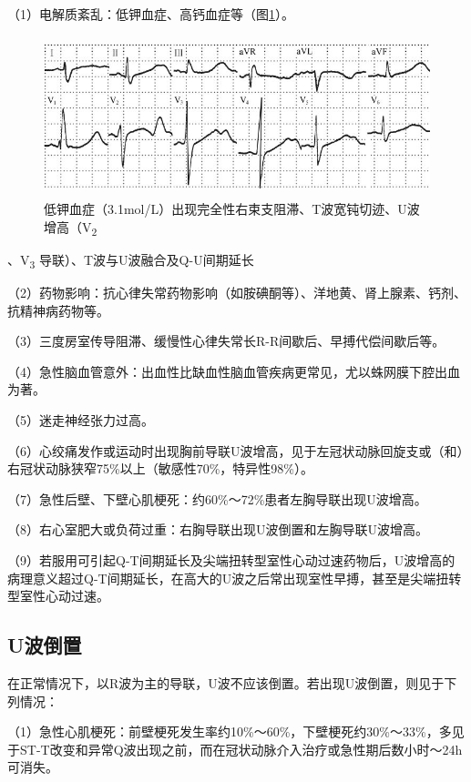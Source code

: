 （1）电解质紊乱：低钾血症、高钙血症等（图\ref{fig8-1}）。

\begin{figure}[!htbp]
 \centering
 \includegraphics[width=4.92708in,height=1.83333in]{./images/Image00120.jpg}
 \captionsetup{justification=centering}
 \caption{低钾血症（3.1mol/L）出现完全性右束支阻滞、T波宽钝切迹、U波增高（V\textsubscript{2}}
 \label{fig8-1}
  \end{figure} 
、V\textsubscript{3} 导联）、T波与U波融合及Q-U间期延长

（2）药物影响：抗心律失常药物影响（如胺碘酮等）、洋地黄、肾上腺素、钙剂、抗精神病药物等。

（3）三度房室传导阻滞、缓慢性心律失常长R-R间歇后、早搏代偿间歇后等。

（4）急性脑血管意外：出血性比缺血性脑血管疾病更常见，尤以蛛网膜下腔出血为著。

（5）迷走神经张力过高。

（6）心绞痛发作或运动时出现胸前导联U波增高，见于左冠状动脉回旋支或（和）右冠状动脉狭窄75\%以上（敏感性70\%，特异性98\%）。

（7）急性后壁、下壁心肌梗死：约60\%～72\%患者左胸导联出现U波增高。

（8）右心室肥大或负荷过重：右胸导联出现U波倒置和左胸导联U波增高。

（9）若服用可引起Q-T间期延长及尖端扭转型室性心动过速药物后，U波增高的病理意义超过Q-T间期延长，在高大的U波之后常出现室性早搏，甚至是尖端扭转型室性心动过速。

\protect\hypertarget{text00014.htmlux5cux23subid111}{}{}

\subsection{U波倒置}

在正常情况下，以R波为主的导联，U波不应该倒置。若出现U波倒置，则见于下列情况：

（1）急性心肌梗死：前壁梗死发生率约10\%～60\%，下壁梗死约30\%～33\%，多见于ST-T改变和异常Q波出现之前，而在冠状动脉介入治疗或急性期后数小时～24h可消失。

